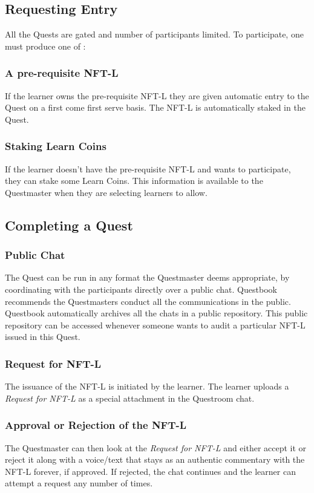 \documentclass{article}
\begin{document}
    \subsection{Requesting Entry}
        All the Quests are gated and number of participants limited. To participate, one must produce one of :
        \subsubsection{A pre-requisite NFT-L}
          If the learner owns the pre-requisite NFT-L they are given automatic entry to the Quest on a first come first serve basis. The NFT-L is automatically staked in the Quest.
        \subsubsection{Staking Learn Coins}
          If the learner doesn't have the pre-requisite NFT-L and wants to participate, they can stake some Learn Coins. This information is available to the Questmaster when they are selecting learners to allow.
    \subsection{Completing a Quest}
        \subsubsection{Public Chat}
          The Quest can be run in any format the Questmaster deems appropriate, by coordinating with the participants directly over a public chat. 
          Questbook recommends the Questmasters conduct all the communications in the public. Questbook automatically archives all the chats in a public repository.
          This public repository can be accessed whenever someone wants to audit a particular NFT-L issued in this Quest.
        \subsubsection{Request for NFT-L}
          The issuance of the NFT-L is initiated by the learner. The learner uploads a \textit{Request for NFT-L} as a special attachment in the Questroom chat.
        \subsubsection{Approval or Rejection of the NFT-L}
          The Questmaster can then look at the \textit{Request for NFT-L} and either accept it or reject it along with a voice/text that stays as an authentic commentary with the NFT-L forever, if approved. 
          If rejected, the chat continues and the learner can attempt a request any number of times.
\end{document}
